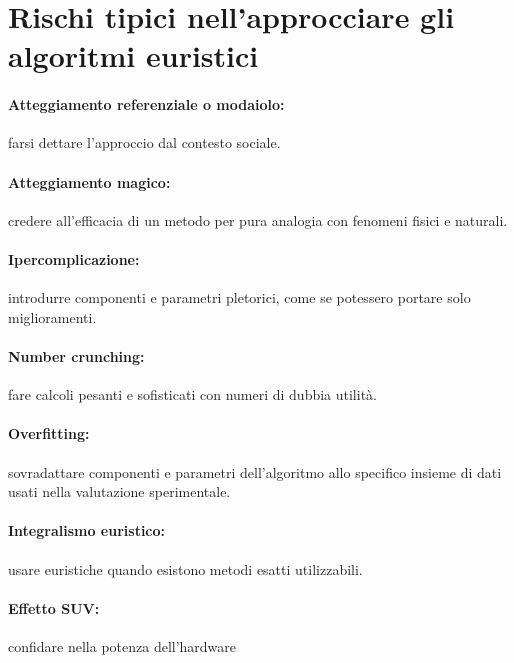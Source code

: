 \documentclass[\main/main.tex]{subfiles}
\begin{document}
\section{Rischi tipici nell'approcciare gli algoritmi euristici}
\begin{multicols}{2}
  \paragraph*{Atteggiamento referenziale o modaiolo:} farsi dettare l'approccio dal contesto sociale.
  \paragraph*{Atteggiamento magico:} credere all'efficacia di un metodo per pura analogia con fenomeni fisici e naturali.
  \paragraph*{Ipercomplicazione:} introdurre componenti e parametri pletorici, come se potessero portare solo miglioramenti.
  \paragraph*{Number crunching:} fare calcoli pesanti e sofisticati con numeri di dubbia utilità.
  \paragraph*{Overfitting:} sovradattare componenti e parametri dell'algoritmo allo specifico insieme di dati usati nella valutazione sperimentale.
  \paragraph*{Integralismo euristico:} usare euristiche quando esistono metodi esatti utilizzabili.
  \paragraph*{Effetto SUV:} confidare nella potenza dell'hardware
\end{multicols}
\end{document}
